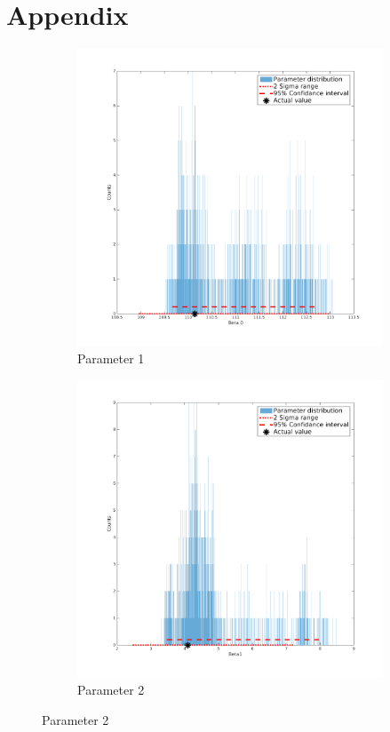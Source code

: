 \documentclass[11pt,a4paper,oneside]{report}
\begin{document}



\chapter*{Appendix}

\begin{figure}[H]
  \begin{subfigure}[b]{0.5\textwidth}
    \includegraphics[width=\textwidth, trim=0 0 0 0,clip=true]{figures/task5/parDistM1P1.png}
    \caption{Parameter 1}
  \end{subfigure}%
  \begin{subfigure}[b]{0.5\textwidth}
    \includegraphics[width=\textwidth, trim=0 0 0 0,clip=true]{figures/task5/parDistM1P2.png}
    \caption{Parameter 2}
  \end{subfigure}%
  

\end{figure}
\end{document}
